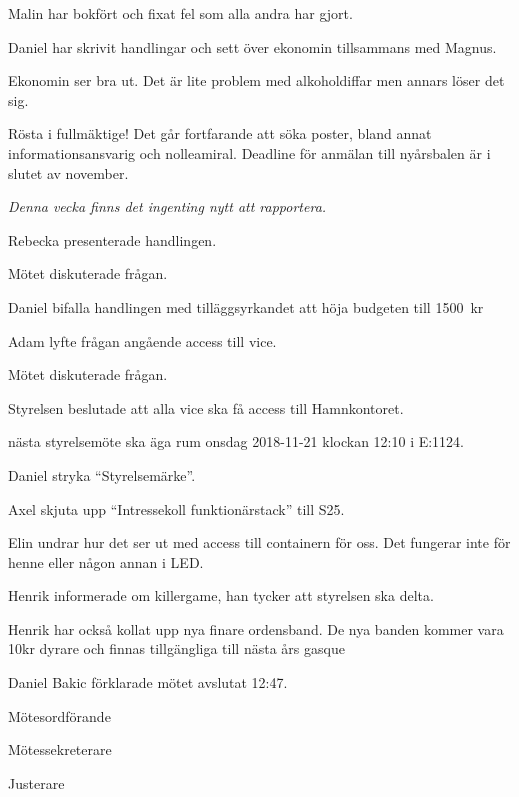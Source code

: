 \documentclass[10pt]{article}
\def\mo{Daniel Bakic}
\def\ms{Axel Voss}
\def\ji{Malin Heyden}
\begin{document}
\begin{paragrafer}
\begin{paragrafer}
		Malin har bokfört och fixat fel som alla andra har gjort. 

		Daniel har skrivit handlingar och sett över ekonomin tillsammans med Magnus. 


		Ekonomin ser bra ut. Det är lite problem med alkoholdiffar men annars löser det sig.


		Rösta i fullmäktige! Det går fortfarande att söka poster, bland annat informationsansvarig och nolleamiral. Deadline för anmälan till nyårsbalen är i slutet av november. 


		\emph{Denna vecka finns det ingenting nytt att rapportera.}

	\end{paragrafer}

	
	Rebecka presenterade handlingen.

	Mötet diskuterade frågan.

	Daniel \ypa bifalla handlingen med tilläggsyrkandet att höja budgeten till \SI{1500}{kr}

	\Mbaby


	Adam lyfte frågan angående access till vice. 

	Mötet diskuterade frågan.

	Styrelsen beslutade att alla vice ska få access till Hamnkontoret.


	\Mba nästa styrelsemöte ska äga rum onsdag 2018-11-21 klockan 12:10 i E:1124.


	Daniel \ypa stryka ``Styrelsemärke''.

	\Mbaby

	Axel \ypa skjuta upp ``Intressekoll funktionärstack'' till S25.

	\Mbaby


	Elin undrar hur det ser ut med access till containern för oss. Det fungerar inte för henne eller någon annan i LED. 

	Henrik informerade om killergame, han tycker att styrelsen ska delta.

	Henrik har också kollat upp nya finare ordensband. De nya banden kommer vara 10kr dyrare och finnas tillgängliga till nästa års gasque

	
	{\mo} förklarade mötet avslutat 12:47.

\end{paragrafer}

\hidesignfoot
\begin{signatures}{3}
	\signature{\mo}{Mötesordförande}
	\signature{\ms}{Mötessekreterare}
	\signature{\ji}{Justerare}
\end{signatures}
\end{document}
